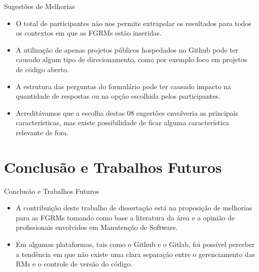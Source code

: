 \documentclass[t,14pt,mathserif]{beamer}
\begin{document}
\begin{frame}{Sugestões de Melhorias}

    \begin{itemize}
        \item O total de participantes não nos permite extrapolar os resultados
            para todos os contextos em que as FGRMs estão inseridas.

        \item A utilização de apenas projetos públicos hospedados no Github pode
            ter causado algum tipo de direcionamento, como por exemplo foco em
            projetos de código aberto.

        \item A estrutura das perguntas do formulário pode ter causado impacto
            na quantidade de respostas ou na opção escolhida pelos
            participantes.

        \item Acreditávamos que a escolha destas 08 sugestões envolveria as
            principais características, mas existe possibilidade de ficar alguma
            característica relevante de fora.
    \end{itemize}

\end{frame}

\section{Conclusão e Trabalhos Futuros}

\begin{frame}{Conclusão e Trabalhos Futuros}
    \begin{itemize}
        \item A contribuição deste trabalho de dissertação está na proposição de
            melhorias para as FGRMs tomando como base a literatura da área e a
            opinião de profissionais envolvidos em Manutenção de Software.

        \item Em algumas plataformas, tais como o Github e o Gitlab, foi
            possível perceber a tendência em que não existe uma clara separação
            entre o gerenciamento das RMs e o controle de versão do código.

    \end{itemize}
\end{frame}
\end{document}

